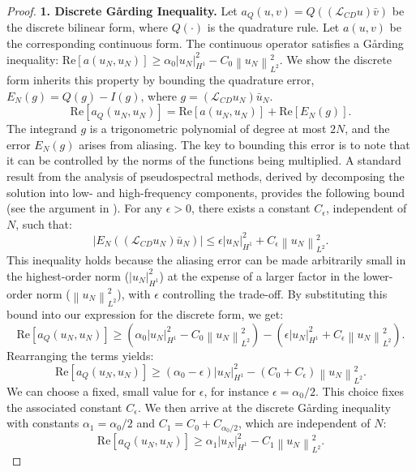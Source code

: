 \documentclass[pdflatex,sn-mathphys-num]{sn-jnl}%
\theoremstyle{thmstyleone}%
\newcommand{\norm}[1]{\left\lVert#1\right\rVert}
\begin{document}
\begin{proof}
\noindent\textbf{1. Discrete G\r{a}rding Inequality.}
Let $a_Q(u,v) = Q((\mathcal{L}_{CD}u)\bar{v})$ be the discrete bilinear form, where $Q(\cdot)$ is the quadrature rule. Let $a(u,v)$ be the corresponding continuous form. The continuous operator satisfies a G\r{a}rding inequality: $\text{Re}[a(u_N, u_N)] \ge \alpha_0 |u_N|_{H^1}^2 - C_0 \norm{u_N}_{L^2}^2$. We show the discrete form inherits this property by bounding the quadrature error, $E_N(g) = Q(g) - I(g)$, where $g = (\mathcal{L}_{CD}u_N)\bar{u}_N$.
\begin{equation} \text{Re}[a_Q(u_N, u_N)] = \text{Re}[a(u_N, u_N)] + \text{Re}[E_N(g)]. \end{equation}
The integrand $g$ is a trigonometric polynomial of degree at most $2N$, and the error $E_N(g)$ arises from aliasing. The key to bounding this error is to note that it can be controlled by the norms of the functions being multiplied. A standard result from the analysis of pseudospectral methods, derived by decomposing the solution into low- and high-frequency components, provides the following bound (see the argument in \cite[Sec.~6.4]{canuto2006spectral}). For any $\epsilon > 0$, there exists a constant $C_\epsilon$, independent of $N$, such that:
\begin{equation} |E_N((\mathcal{L}_{CD}u_N)\bar{u}_N)| \le \epsilon |u_N|_{H^1}^2 + C_\epsilon \norm{u_N}_{L^2}^2. \end{equation}
This inequality holds because the aliasing error can be made arbitrarily small in the highest-order norm ($|u_N|_{H^1}^2$) at the expense of a larger factor in the lower-order norm ($\norm{u_N}_{L^2}^2$), with $\epsilon$ controlling the trade-off. By substituting this bound into our expression for the discrete form, we get:
\begin{equation} \text{Re}[a_Q(u_N, u_N)] \ge (\alpha_0 |u_N|_{H^1}^2 - C_0 \norm{u_N}_{L^2}^2) - (\epsilon |u_N|_{H^1}^2 + C_\epsilon \norm{u_N}_{L^2}^2). \end{equation}
Rearranging the terms yields:
\begin{equation} \text{Re}[a_Q(u_N, u_N)] \ge (\alpha_0 - \epsilon)|u_N|_{H^1}^2 - (C_0 + C_\epsilon)\norm{u_N}_{L^2}^2. \end{equation}
We can choose a fixed, small value for $\epsilon$, for instance $\epsilon = \alpha_0/2$. This choice fixes the associated constant $C_\epsilon$. We then arrive at the discrete G\r{a}rding inequality with constants $\alpha_1 = \alpha_0/2$ and $C_1 = C_0+C_{\alpha_0/2}$, which are independent of $N$:
\begin{equation} \text{Re}[a_Q(u_N, u_N)] \ge \alpha_1 |u_N|_{H^1}^2 - C_1 \norm{u_N}_{L^2}^2. \end{equation}


\end{proof}
\end{document}
